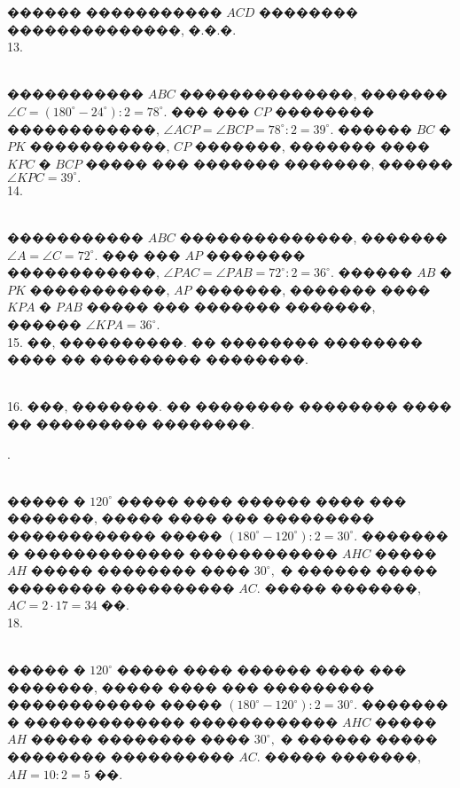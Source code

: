 \documentclass[12pt]{article}
\begin{document}
������ ����������� $ACD$ �������� ��������������, �.�.�.\\
13. \begin{figure}[ht!]
\end{figure}\\
����������� $ABC$ ��������������, ������� $\angle C=(180^\circ-24^\circ):2=78^\circ.$ ��� ��� $CP$ �������� ������������, $\angle ACP=\angle BCP=78^\circ:2=39^\circ.$ ������ $BC$ � $PK$ �����������, $CP$ �������, ������� ���� $KPC$ � $BCP$ ����� ��� ������� �������, ������ $\angle KPC=39^\circ.$\\
14. \begin{figure}[ht!]
\end{figure}\\
����������� $ABC$ ��������������, ������� $\angle A=\angle C =72^\circ.$ ��� ��� $AP$ �������� ������������, $\angle PAC=\angle PAB=72^\circ:2=36^\circ.$ ������ $AB$ � $PK$ �����������, $AP$ �������, ������� ���� $KPA$ � $PAB$ ����� ��� ������� �������, ������ $\angle KPA=36^\circ.$\\
15. ��, ����������. �� �������� �������� ���� �� ��������� ��������.
\begin{figure}[ht!]
\end{figure}\\
16. ���, �������. �� �������� �������� ���� �� ��������� ��������.
\begin{figure}[ht!]
\end{figure}\newpage{}. \begin{figure}[ht!]
\end{figure}\\
����� � $120^\circ$ ����� ���� ������ ���� ��� �������, ����� ���� ��� ��������� ������������ ����� $(180^\circ-120^\circ):2=30^\circ.$ ������� � ������������� ������������ $AHC$ ����� $AH$ ����� �������� ���� $30^\circ,$ � ������ ����� �������� ���������� $AC.$ ����� �������, $AC=2\cdot17=34$ ��.\\
18. \begin{figure}[ht!]
\end{figure}\\
����� � $120^\circ$ ����� ���� ������ ���� ��� �������, ����� ���� ��� ��������� ������������ ����� $(180^\circ-120^\circ):2=30^\circ.$ ������� � ������������� ������������ $AHC$ ����� $AH$ ����� �������� ���� $30^\circ,$ � ������ ����� �������� ���������� $AC.$ ����� �������, $AH=10:2=5$ ��.\\
\end{document}
